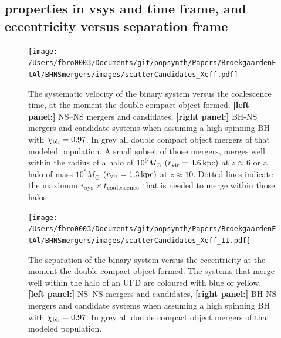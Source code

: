 \documentclass[a4paper,fleqn,usenatbib,useAMS,usedcolumn]{mnras}
\begin{document}
\subsection{properties in vsys and time frame, and eccentricity versus separation frame }
%
\begin{figure}
	\texttt{[image: /Users/fbro0003/Documents/git/popsynth/Papers/BroekgaardenEtAl/BHNSmergers/images/scatterCandidates\_Xeff.pdf]} %
    \caption{The systematic velocity of the binary system versus the coalescence time, at the moment the double compact object formed. \textbf{[left panel:] } NS--NS mergers and candidates,   \textbf{[right panel:] } BH-NS mergers and candidate systems when assuming a high spinning BH with  $\chi_{\rm{bh}} = 0.97$. In grey all double compact object mergers of that modeled population. A small subset of those mergers, merges well within the radius of a halo of $10^9 M_{\odot} \ (r_{\rm{vir}}   = 4.6 \, \rm{kpc})$ at $z \approx 6$ or a halo of mass   $10^8 M_{\odot} $ $ (r_{\rm{vir}}   = 1.3 \, \rm{kpc})$ at $z \approx 10$.   Dotted lines indicate the maximum $v_{\rm{sys}} \times t_{\rm{coalescence}}$ that is needed to merge within those halos}
    \label{fig:NbinariesVsNHits}
\end{figure}


%
\begin{figure}
	\texttt{[image: /Users/fbro0003/Documents/git/popsynth/Papers/BroekgaardenEtAl/BHNSmergers/images/scatterCandidates\_Xeff\_II.pdf]} %
    \caption{The separation  of the binary system versus the eccentricity at the moment the double compact object formed. The systems that merge well within the halo of an UFD are coloured with blue or yellow.  \textbf{[left panel:] } NS--NS mergers and candidates,   \textbf{[right panel:] } BH-NS mergers and candidate systems when assuming a high spinning BH with  $\chi_{\rm{bh}} = 0.97$. In grey all double compact object mergers of that modeled population.}
    \label{fig:NbinariesVsNHits}
\end{figure}
\end{document}
